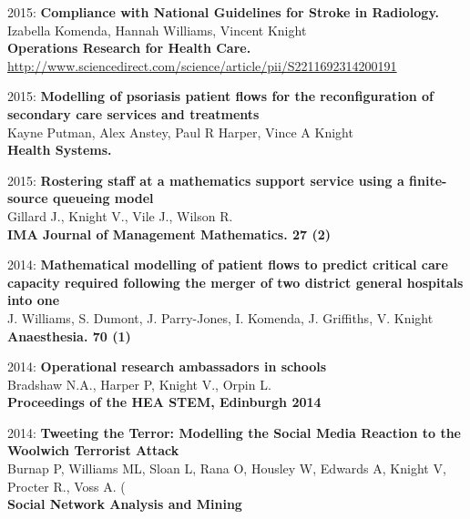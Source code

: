 \documentclass[10pt]{res} %
\begin{document}
\begin{resume}
\begin{etaremune}
\item
2015: \textbf{Compliance with National Guidelines for Stroke in Radiology.}\\
Izabella Komenda, Hannah Williams, Vincent Knight
\\
\textbf{Operations Research for Health Care.}
\\
\url{http://www.sciencedirect.com/science/article/pii/S2211692314200191}
\\

\item
2015: \textbf{Modelling of psoriasis patient flows for the reconfiguration of secondary care services and treatments}\\
Kayne Putman, Alex Anstey, Paul R Harper, Vince A Knight
\\
\textbf{Health Systems.}
\\

\item
2015: \textbf{Rostering staff at a mathematics support service using a finite-source queueing model}\\
Gillard J., Knight V., Vile J., Wilson R.
\\
\textbf{IMA Journal of Management Mathematics. 27 (2)}
\\

\item
2014: \textbf{Mathematical modelling of patient flows to predict critical care capacity required following the merger of two district general hospitals into one}\\
J. Williams, S. Dumont, J. Parry-Jones, I. Komenda, J. Griffiths, V. Knight
\\
\textbf{Anaesthesia. 70 (1)}
\\

\item
2014: \textbf{Operational research ambassadors in schools}\\
Bradshaw N.A., Harper P, Knight V., Orpin L.
\\
\textbf{Proceedings of the HEA STEM, Edinburgh 2014}
\\

\item
2014: \textbf{Tweeting the Terror: Modelling the Social Media Reaction to the Woolwich Terrorist Attack}\\
Burnap P, Williams ML, Sloan L, Rana O, Housley W, Edwards A, Knight V, Procter R., Voss A. (
\\
\textbf{Social Network Analysis and Mining}
\\


\end{etaremune}
\end{resume}
\end{document}
